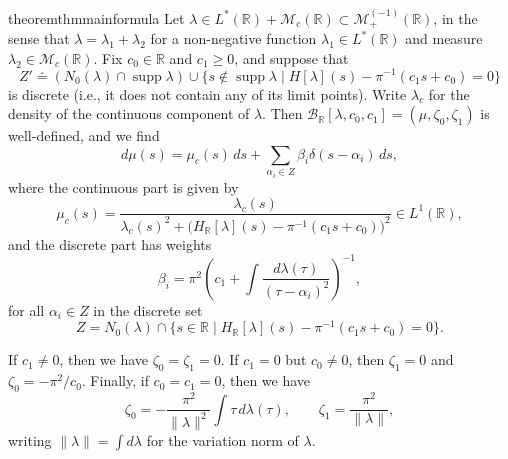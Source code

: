\documentclass{cams-l} %
\newcommand{\RR}{\mathbb R}
\newcommand{\cM}{\mathcal M}
\newcommand{\cB}{\mathcal B}
\newcommand{\op}{\operatorname}
\newcommand{\supp}{\operatorname{supp}}
\renewcommand{\Re}{\op{Re}}
\theoremstyle{definition}
\theoremstyle{remark}
\numberwithin{equation}{section}
\begin{document}
\begin{restatable}[Closed form of $\cB_\RR$]{theorem}{thmmainformula}\label{thm:main_formula}
    Let $\lambda\in L^*(\RR) +\cM_c(\RR)\subset\cM_+^{(-1)}(\RR)$, in the sense that $\lambda=\lambda_1+\lambda_2$ for a non-negative function $\lambda_1\in L^*(\RR)$ and measure $\lambda_2\in\cM_c(\RR)$. Fix $c_0\in\RR$ and $c_1\geq 0$, and suppose that
    \[Z'\doteq \left(N_0(\lambda)\cap\supp\lambda\right)\cup\{s\notin\supp\lambda\;|\;H[\lambda](s) - \pi^{-1}(c_1s + c_0) = 0\}\]
    is discrete (i.e., it does not contain any of its limit points). Write $\lambda_c$ for the density of the continuous component of $\lambda$. Then $\cB_\RR[\lambda,c_0,c_1] = (\mu,\zeta_0,\zeta_1)$ is well-defined, and we find
    \begin{equation}\label{eq:dmu}
        d\mu(s) = \mu_c(s)\,ds + \sum_{\alpha_i\in Z} \beta_i\delta(s-\alpha_i)\,ds,
    \end{equation}
    where the continuous part is given by
    \begin{equation}\label{eq:mu_c}
        \mu_c(s) = \frac{\lambda_c(s)}{\lambda_c(s)^2 + \big(H_\RR[\lambda](s) - \pi^{-1}(c_1s + c_0)\big)^2} \in L^1(\RR),
    \end{equation}
    and the discrete part has weights
    \begin{equation}\label{eq:betaeq}
        \beta_i = \pi^2\left(c_1 + \int\frac{d\lambda(\tau)}{(\tau-\alpha_i)^2}\right)^{-1},
    \end{equation}
    for all $\alpha_i \in Z$ in the discrete set
    \begin{equation}\label{eq:zero_set}
        Z = N_0(\lambda)\cap\big\{s\in\RR\;\big|\;H_\mathbb{R}[\lambda](s) - \pi^{-1}(c_1s + c_0) = 0\big\}.
    \end{equation}
    
    If $c_1\neq 0$, then we have $\zeta_0 = \zeta_1 = 0$. If $c_1 = 0$ but $c_0\neq 0$, then $\zeta_1 = 0$ and $\zeta_0 = -\pi^2/c_0$. Finally, if $c_0=c_1=0$, then we have
    \begin{equation}\label{eq:zetas}
        \zeta_0 = -\frac{\pi^2}{\|\lambda\|^2}\int\tau\,d\lambda(\tau),\qquad \zeta_1 = \frac{\pi^2}{\|\lambda\|},
    \end{equation}
    writing $\|\lambda\| = \int d\lambda$ for the variation norm of $\lambda$.
\end{restatable}
\end{document}
